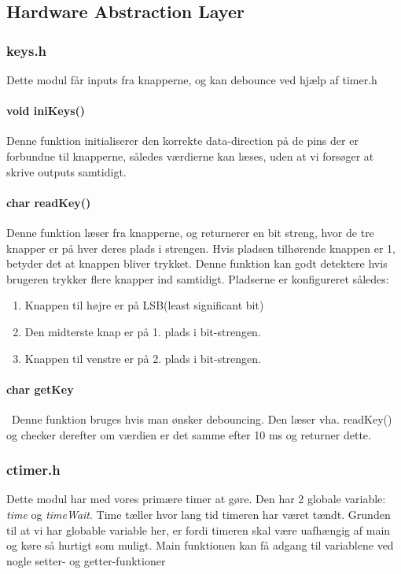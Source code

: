 \subsection{Hardware Abstraction Layer}
\subsubsection{keys.h}
Dette modul får inputs fra knapperne, og kan debounce ved hjælp af timer.h
\paragraph{void iniKeys()}
Denne funktion initialiserer den korrekte data-direction på de pins der er forbundne til knapperne, således værdierne kan læses, uden at vi forsøger at skrive outputs samtidigt.

\paragraph{char readKey()}
Denne funktion læser fra knapperne, og returnerer en bit streng, hvor de tre knapper er på hver deres plads i strengen. Hvis pladsen tilhørende knappen er 1, betyder det at knappen bliver trykket. Denne funktion kan godt detektere hvis brugeren trykker flere knapper ind samtidigt. Pladserne er konfigureret således:
\begin{enumerate}
\item Knappen til højre er på LSB(least significant bit)
\item Den midterste knap er på 1. plads i bit-strengen.
\item Knappen til venstre er på 2. plads i bit-strengen.
\end{enumerate}

\paragraph{char getKey}\
Denne funktion bruges hvis man ønsker debouncing. Den læser vha. readKey() og checker derefter om værdien er det samme efter 10 ms og returner dette.
\subsubsection{ctimer.h}
Dette modul har med vores primære timer at gøre. Den har 2 globale variable: \textit{time} og \textit{timeWait}. Time tæller hvor lang tid timeren har været tændt. Grunden til at vi har globable variable her, er fordi timeren skal være uafhængig af main og køre så hurtigt som muligt. Main funktionen kan få adgang til variablene ved nogle setter- og getter-funktioner
